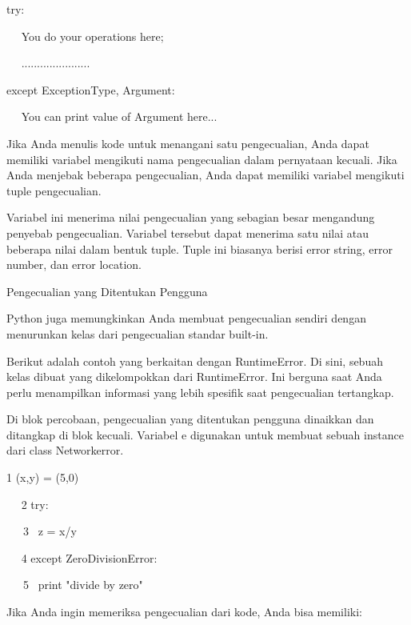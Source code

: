 \vspace{12pt}
try: \par
~~ You do your operations here; \par
~~ ...................... \par
except ExceptionType, Argument: \par
~~ You can print value of Argument here... \par
\vspace{12pt}
Jika Anda menulis kode untuk menangani satu pengecualian, Anda dapat memiliki variabel mengikuti nama pengecualian dalam pernyataan kecuali. Jika Anda menjebak beberapa pengecualian, Anda dapat memiliki variabel mengikuti tuple pengecualian. \par
\vspace{12pt}
Variabel ini menerima nilai pengecualian yang sebagian besar mengandung penyebab pengecualian. Variabel tersebut dapat menerima satu nilai atau beberapa nilai dalam bentuk tuple. Tuple ini biasanya berisi error string, error number, dan error location. \par
\vspace{12pt}
Pengecualian yang Ditentukan Pengguna \par
\vspace{12pt}
Python juga memungkinkan Anda membuat pengecualian sendiri dengan menurunkan kelas dari pengecualian standar built-in. \par
\vspace{12pt}
Berikut adalah contoh yang berkaitan dengan RuntimeError. Di sini, sebuah kelas dibuat yang dikelompokkan dari RuntimeError. Ini berguna saat Anda perlu menampilkan informasi yang lebih spesifik saat pengecualian tertangkap. \par
\vspace{12pt}
Di blok percobaan, pengecualian yang ditentukan pengguna dinaikkan dan ditangkap di blok kecuali. Variabel e digunakan untuk membuat sebuah instance dari class Networkerror. \par
\vspace{12pt}
1 (x,y) = (5,0) \par
~~ 2 try: \par
~~~3~  z = x/y \par
~~ 4 except ZeroDivisionError: \par
~~~5~  print "divide by zero" \par
Jika Anda ingin memeriksa pengecualian dari kode, Anda bisa memiliki: \par
\vspace{12pt}
